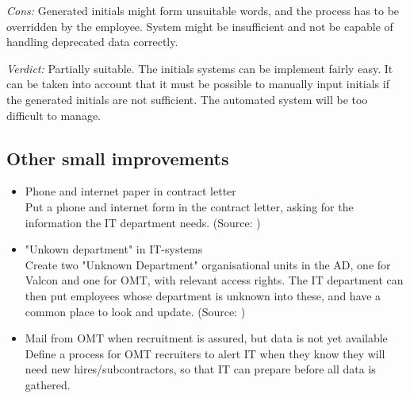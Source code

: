 \noindent \emph{Cons:} 
Generated initials might form unsuitable words, and the process has to be overridden by the employee.
System might be insufficient and not be capable of handling deprecated data correctly. 

\emph{Verdict:}
Partially suitable. The initials systems can be implement fairly easy. It can be taken into account that it must be possible to manually input initials if the generated initials are not sufficient.
The automated system will be too difficult to manage.

\subsection{Other small improvements}
\begin{itemize}
	\item Phone and internet paper in contract letter\\
	
			Put a phone and internet form in the contract letter, asking for the information the IT department needs.
			(Source: )			
	
	\item "Unkown department" in IT-systems\\
	
			Create two "Unknown Department" organisational units in the AD, one for Valcon and one for OMT, with relevant access rights. The IT department can then put employees whose department is unknown into these, and have a common place to look and update.
			(Source: )
			
	\item Mail from OMT when recruitment is assured, but data is not yet available\\
	
			Define a process for OMT recruiters to alert IT when they know they will need new hires/subcontractors, so that IT can prepare before all data is gathered.
\end{itemize}